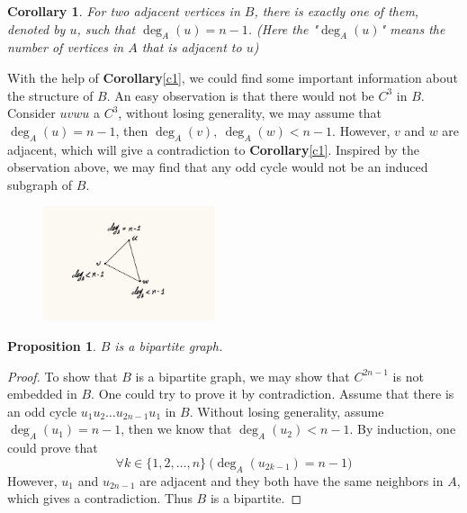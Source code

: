 \documentclass{article}
\newtheorem{prop}{\bf Proposition}
\newtheorem{corollary}{Corollary}
\begin{document}
    \begin{corollary}\label{c1}
        For two adjacent vertices in $B$, there is exactly one of them, denoted by $u$, such that $\deg_A(u)=n-1$. (Here the "$\deg_A(u)$" means the number of vertices in $A$ that is adjacent to $u$)
    \end{corollary}

    
    With the help of \textbf{Corollary}\eqref{c1}, we could find some important information about the structure of $B$. An easy observation is that there would not be $C^3$ in $B$. Consider $uvwu$ a $C^3$, without losing generality, we may assume that $\deg_A(u)=n-1$, then $\deg_A(v),\ \deg_A(w)<n-1$. However, $v$ and $w$ are adjacent, which will give a contradiction to \textbf{Corollary}\eqref{c1}. Inspired by the observation above, we may find that any odd cycle would not be an induced subgraph of $B$.

    \begin{figure}[h!]%
        \centering
        \includegraphics[width=0.45\textwidth]{pic/g3.jpg}
    \end{figure}

    \newpage
    
    \begin{prop}
        $B$ is a bipartite graph.
    \end{prop}    
    
    \begin{proof}
        To show that $B$ is a bipartite graph, we may show that $C^{2n-1}$ is not embedded in $B$. One could try to prove it by contradiction. Assume that there is an odd cycle $u_1u_2\ldots u_{2n-1}u_1$ in $B$. Without losing generality, assume $\deg_A(u_1)=n-1$, then we know that $\deg_A(u_2)<n-1$. By induction, one could prove that $$\forall k\in\{1,2,\ldots,n\}\ \big(\deg_A(u_{2k-1})=n-1\big)$$
        However, $u_1$ and $u_{2n-1}$ are adjacent and they both have the same neighbors in $A$, which gives a contradiction. Thus $B$ is a bipartite.
    \end{proof}
\end{document}
